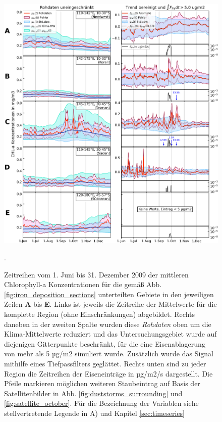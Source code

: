 \documentclass[12pt,a4paper,onecolumn]{scrartcl}
\begin{document}
\begin{figure}[!htb]
\includegraphics[width=\textwidth]{bilder/timeseries_all.png}
\caption{Zeitreihen vom 1. Juni bis 31. Dezember 2009 der mittleren Chlorophyll-a Konzentrationen für die gemäß Abb. \ref{fig:iron_deposition_sections} unterteilten Gebiete in den jeweiligen Zeilen \textbf{A} bis \textbf{E}. Links ist jeweils die Zeitreihe der Mittelwerte für die komplette Region (ohne Einschränkungen) abgebildet. Rechts daneben in der zweiten Spalte wurden diese \textit{Rohdaten} oben um die Klima-Mittelwerte reduziert und das Untersuchungsgebiet wurde auf diejenigen Gitterpunkte beschränkt, für die eine Eisenablagerung von mehr als 5 µg/m2 simuliert wurde. Zusätzlich wurde das Signal mithilfe eines Tiefpassfilters geglättet. Rechts unten sind zu jeder Region die Zeitreihen der Eiseneinträge in µg/m2/s dargestellt. Die Pfeile markieren möglichen weiteren Staubeintrag auf Basis der Satellitenbilder in Abb. \ref{fig:duststorms_surrounding} und \ref{fig:satellite_october}. Für die Bezeichnung der Variablen siehe stellvertretende Legende in A) und Kapitel \ref{sec:timeseries}}. \label{fig:timeseries_full}
\end{figure}
\end{document}
